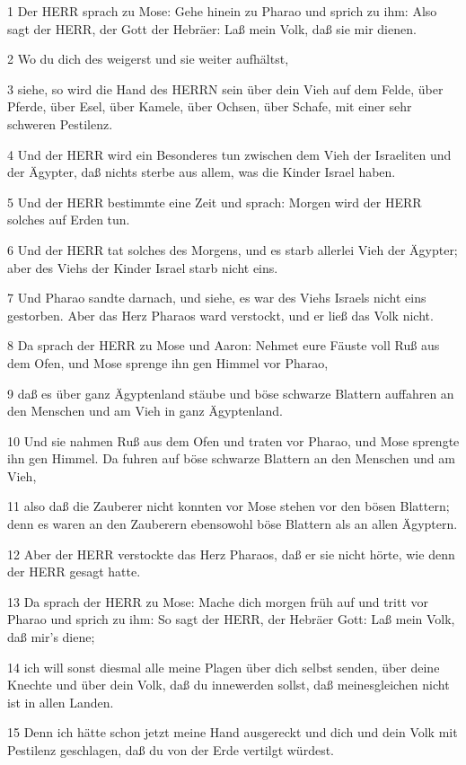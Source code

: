 \par 1 Der HERR sprach zu Mose: Gehe hinein zu Pharao und sprich zu ihm: Also sagt der HERR, der Gott der Hebräer: Laß mein Volk, daß sie mir dienen.
\par 2 Wo du dich des weigerst und sie weiter aufhältst,
\par 3 siehe, so wird die Hand des HERRN sein über dein Vieh auf dem Felde, über Pferde, über Esel, über Kamele, über Ochsen, über Schafe, mit einer sehr schweren Pestilenz.
\par 4 Und der HERR wird ein Besonderes tun zwischen dem Vieh der Israeliten und der Ägypter, daß nichts sterbe aus allem, was die Kinder Israel haben.
\par 5 Und der HERR bestimmte eine Zeit und sprach: Morgen wird der HERR solches auf Erden tun.
\par 6 Und der HERR tat solches des Morgens, und es starb allerlei Vieh der Ägypter; aber des Viehs der Kinder Israel starb nicht eins.
\par 7 Und Pharao sandte darnach, und siehe, es war des Viehs Israels nicht eins gestorben. Aber das Herz Pharaos ward verstockt, und er ließ das Volk nicht.
\par 8 Da sprach der HERR zu Mose und Aaron: Nehmet eure Fäuste voll Ruß aus dem Ofen, und Mose sprenge ihn gen Himmel vor Pharao,
\par 9 daß es über ganz Ägyptenland stäube und böse schwarze Blattern auffahren an den Menschen und am Vieh in ganz Ägyptenland.
\par 10 Und sie nahmen Ruß aus dem Ofen und traten vor Pharao, und Mose sprengte ihn gen Himmel. Da fuhren auf böse schwarze Blattern an den Menschen und am Vieh,
\par 11 also daß die Zauberer nicht konnten vor Mose stehen vor den bösen Blattern; denn es waren an den Zauberern ebensowohl böse Blattern als an allen Ägyptern.
\par 12 Aber der HERR verstockte das Herz Pharaos, daß er sie nicht hörte, wie denn der HERR gesagt hatte.
\par 13 Da sprach der HERR zu Mose: Mache dich morgen früh auf und tritt vor Pharao und sprich zu ihm: So sagt der HERR, der Hebräer Gott: Laß mein Volk, daß mir's diene;
\par 14 ich will sonst diesmal alle meine Plagen über dich selbst senden, über deine Knechte und über dein Volk, daß du innewerden sollst, daß meinesgleichen nicht ist in allen Landen.
\par 15 Denn ich hätte schon jetzt meine Hand ausgereckt und dich und dein Volk mit Pestilenz geschlagen, daß du von der Erde vertilgt würdest.
